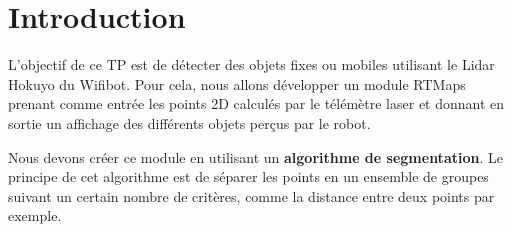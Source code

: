 \chapter{Introduction}

L'objectif de ce TP est de détecter des objets fixes ou mobiles utilisant le Lidar Hokuyo du Wifibot. Pour cela, nous allons développer un module RTMaps prenant comme entrée les points 2D calculés par le télémètre laser et donnant en sortie un affichage des différents objets perçus par le robot.

\bigskip

Nous devons créer ce module en utilisant un \textbf{algorithme de segmentation}. Le principe de cet algorithme est de séparer les points en un ensemble de groupes suivant un certain nombre de critères, comme la distance entre deux points par exemple.